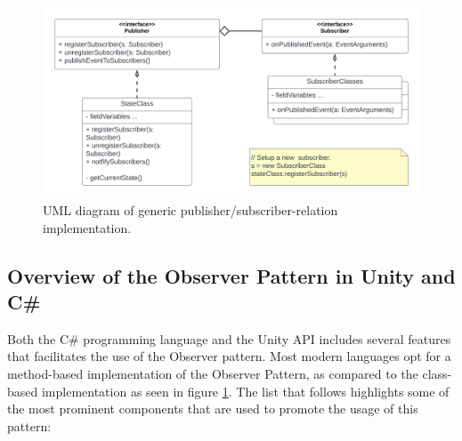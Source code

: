    \begin{figure}[H]
      \centering
      \includegraphics[scale=0.75]{Project_report/figures/theory/design_patterns/observer_uml.png}
      \caption{UML diagram of generic publisher/subscriber-relation implementation.}
      \label{fig:observer_uml}
    \end{figure}

\subsection{Overview of the Observer Pattern in Unity and C\#}
    Both the C\# programming language and the Unity API includes several features that facilitates the use of the Observer pattern. Most modern languages opt for a method-based implementation of the Observer Pattern, as compared to the class-based implementation as seen in figure \ref{fig:observer_uml}. The list that follows highlights some of the most prominent components that are used to promote the usage of this pattern:

